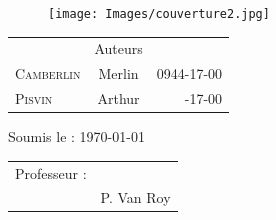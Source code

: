 \begin{titlepage}
\begin{sffamily}
\begin{center}
        \begin{figure}[h!]
        \centering
        \texttt{[image: Images/couverture2.jpg]}
        \end{figure}
    
\vfill
\large   
    
        \begin{table}[ht!]
\centering
\large
            \begin{tabular}{lcr}
                     & \Large{Auteurs} & \\
                \LARGE{\textsc{Camberlin}} & \Large{Merlin} & \Large{0944-17-00} \\
                \LARGE{\textsc{Pisvin}} & \Large{Arthur} & \Large{-17-00} \\

            \end{tabular}
  
        \end{table}
\vspace{3cm}
    \begin{center}
        Soumis le : \today
    \end{center}
    
    
\vfill

\begin{tabular}{p{}p{}}
    \flushleft Professeur : \\
    & \flushright P. Van Roy\\
 
\end{tabular} 
    
\end{center}
\end{sffamily}
\end{titlepage}
